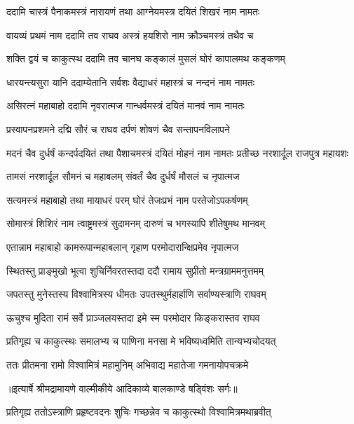 \twolineshloka
{ददामि चास्त्रं पैनाकमस्त्रं नारायणं तथा}
{आग्नेयमस्त्र दयितं शिखरं नाम नामतः} %

\twolineshloka
{वायव्यं प्रथमं नाम ददामि तव राघव}
{अस्त्रं हयशिरो नाम क्रौञ्चमस्त्रं तथैव च} %

\twolineshloka
{शक्ति द्वयं च काकुत्स्थ ददामि तव चानघ}
{कङ्कालं मुसलं घोरं कापालमथ कङ्कणम्} %

\twolineshloka
{धारयन्त्यसुरा यानि ददाम्येतानि सर्वशः}
{वैद्याधरं महास्त्रं च नन्दनं नाम नामतः} %

\twolineshloka
{असिरत्नं महाबाहो ददामि नृवरात्मज}
{गान्धर्वमस्त्रं दयितं मानवं नाम नामतः} %

\twolineshloka
{प्रस्वापनप्रशमने दद्मि सौरं च राघव}
{दर्पणं शोषणं चैव सन्तापनविलापने} %

\threelineshloka
{मदनं चैव दुर्धर्षं कन्दर्पदयितं तथा}
{पैशाचमस्त्रं दयितं मोहनं नाम नामतः}
{प्रतीच्छ नरशार्दूल राजपुत्र महायशः} %

\twolineshloka
{तामसं नरशार्दूल सौमनं च महाबलम्}
{संवर्तं चैव दुर्धर्षं मौसलं च नृपात्मज} %

\twolineshloka
{सत्यमस्त्रं महाबाहो तथा मायाधरं परम्}
{घोरं तेजःप्रभं नाम परतेजोऽपकर्षणम्} %

\twolineshloka
{सोमास्त्रं शिशिरं नाम त्वाष्ट्रमस्त्रं सुदामनम्}
{दारुणं च भगस्यापि शीतेषुमथ मानवम्} %

\twolineshloka
{एतान्नाम महाबाहो कामरूपान्महाबलान्}
{गृहाण परमोदारान्क्षिप्रमेव नृपात्मज} %

\twolineshloka
{स्थितस्तु प्राङ्मुखो भूत्वा शुचिर्निवरतस्तदा}
{ददौ रामाय सुप्रीतो मन्त्रग्राममनुत्तमम्} %

\twolineshloka
{जपतस्तु मुनेस्तस्य विश्वामित्रस्य धीमतः}
{उपतस्थुर्महार्हाणि सर्वाण्यस्त्राणि राघवम्} %

\twolineshloka
{ऊचुश्च मुदिता रामं सर्वे प्राञ्जलयस्तदा}
{इमे स्म परमोदार किङ्करास्तव राघव} %

\twolineshloka
{प्रतिगृह्य च काकुत्स्थः समालभ्य च पाणिना}
{मनसा मे भविष्यध्वमिति तान्यभ्यचोदयत्} %

\twolineshloka
{ततः प्रीतमना रामो विश्वामित्रं महामुनिम्}
{अभिवाद्य महातेजा गमनायोपचक्रमे} %


{॥इत्यार्षे श्रीमद्रामायणे वाल्मीकीये आदिकाव्ये बालकाण्डे षड्विंशः सर्गः॥}


\twolineshloka
{प्रतिगृह्य ततोऽस्त्राणि प्रहृष्टवदनः शुचिः}
{गच्छन्नेव च काकुत्स्थो विश्वामित्रमथाब्रवीत्} %


